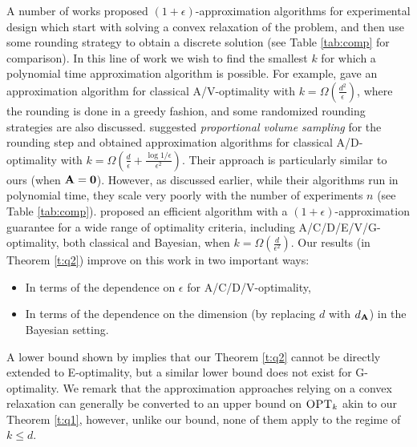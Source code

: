 \documentclass[11pt]{article}
\begin{document}
A number of works proposed $(1+\epsilon)$-approximation algorithms
for experimental design which start with solving a convex
relaxation of the problem, and then use some rounding strategy to
obtain a discrete solution (see Table \ref{tab:comp} for comparison).
In this line of work we wish to find the smallest $k$ for which a
polynomial time approximation algorithm is possible. For example,
\cite{tractable-experimental-design} gave an approximation algorithm
for classical A/V-optimality with $k=\Omega(\frac{d^2}{\epsilon})$, where the
rounding is done in a greedy fashion, and some randomized rounding
strategies are also discussed. \cite{proportional-volume-sampling}
suggested \emph{proportional volume sampling} for the rounding step
and obtained approximation algorithms for classical A/D-optimality with
$k=\Omega(\frac d\epsilon+\frac {\log1/\epsilon}{\epsilon^2})$. Their
approach is particularly similar to ours (when $\mathbf A=\mathbf 0$). However,
as discussed earlier, while their algorithms run in polynomial time,
they scale very poorly with the number of experiments $n$ (see Table 
\ref{tab:comp}). \cite{near-optimal-design} proposed  
an efficient algorithm with a $(1+\epsilon)$-approximation guarantee for a wide
range of optimality criteria, including A/C/D/E/V/G-optimality, both classical and Bayesian, when
$k=\Omega(\frac d{\epsilon^2})$.  Our results (in Theorem \ref{t:q2}) improve on this work in
two important ways: 
\begin{itemize}
  \item In terms of the dependence on $\epsilon$ for A/C/D/V-optimality,
  \item In terms of the dependence on the dimension 
  (by replacing $d$ with $d_{\mathbf A}$) in the Bayesian setting.
\end{itemize}
A lower bound shown by \cite{proportional-volume-sampling} implies that our
Theorem \ref{t:q2} cannot be
directly extended to E-optimality, but a similar lower bound does not
exist for G-optimality. We remark that the approximation approaches
relying on a convex relaxation can generally be converted to
an upper bound on ${\textsc{OPT}_k}$ akin to our Theorem \ref{t:q1},
however, unlike our bound, none of them apply to the regime of $k\leq d$.
\end{document}
